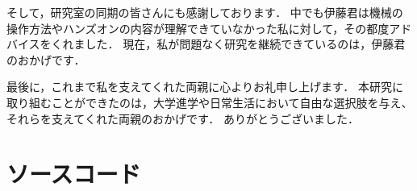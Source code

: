 \documentclass[titlepage]{jsreport}
\begin{document}
そして，研究室の同期の皆さんにも感謝しております．
中でも伊藤君は機械の操作方法やハンズオンの内容が理解できていなかった私に対して，その都度アドバイスをくれました．
現在，私が問題なく研究を継続できているのは，伊藤君のおかげです．

最後に，これまで私を支えてくれた両親に心よりお礼申し上げます．
本研究に取り組むことができたのは，大学進学や日常生活において自由な選択肢を与え、それらを支えてくれた両親のおかげです．
ありがとうございました．

\appendix

\chapter{ソースコード}





\end{document}
